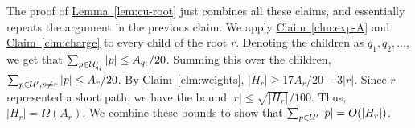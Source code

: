 \documentclass[11pt]{article}
\theoremstyle{definition}
\newcommand{\cU}{{\cal U}}
\newcommand{\Clm}[1]{\hyperref[clm:#1]{Claim~\ref*{clm:#1}}} %
\newcommand{\Lem}[1]{\hyperref[lem:#1]{Lemma~\ref*{lem:#1}}} %
\newcommand{\Cor}[1]{\hyperref[cor:#1]{Corollary~\ref*{cor:#1}}} %
\newcommand{\redH}{\widetilde{H}}
\newcommand{\pth}[2][\!]{#1\left({#2}\right)}
\begin{document}
The proof of \Lem{cu-root} just combines all these claims, and essentially
repeats the argument in the previous claim. We apply \Clm{exp-A} and \Clm{charge}
to every child of the root $r$. Denoting the children as $q_1, q_2, \ldots$,
we get that $\sum_{p \in \pruned_{q_i}} |p| \leq A_{q_i}/20$.
Summing this over the children, $\sum_{p \in \pruned, p \neq r} |p| \leq A_r/20$.
By \Clm{weights}, $|H_r| \geq 17A_r/20 - 3|r|$. Since $r$ represented a short path, 
we have the bound $|r| \leq \sqrt{|H_r|}/100$. Thus, $|H_r| = \Omega(A_r)$.
We combine these bounds to show that $\sum_{p \in \pruned} |p| = O(|H_r|)$.
% 
% 
% 
% 
% 
% 
% 
\end{document}
